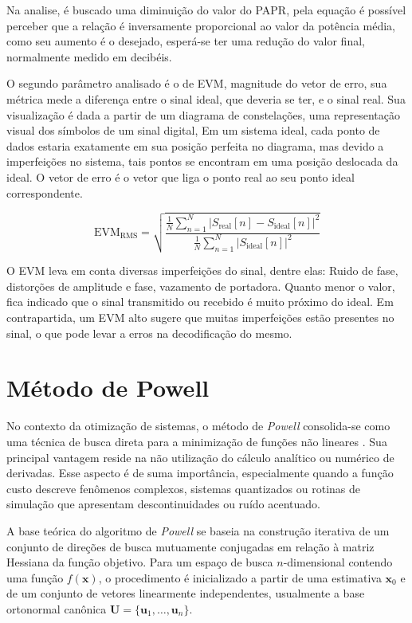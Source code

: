 Na analise, é buscado uma diminuição do valor do PAPR, pela equação é possível perceber que a relação é inversamente proporcional ao valor da potência média, como seu aumento é o desejado, esperá-se ter uma redução do valor final, normalmente medido em decibéis.

O segundo parâmetro analisado é o de EVM, magnitude do vetor de erro, sua métrica mede a diferença entre o sinal ideal, que deveria se ter, e o sinal real. Sua visualização é dada a partir de um diagrama de constelações, uma representação visual dos símbolos de um sinal digital, Em um sistema ideal, cada ponto de dados estaria exatamente em sua posição perfeita no diagrama, mas devido a imperfeições no sistema, tais pontos se encontram em uma posição deslocada da ideal. O vetor de erro é o vetor que liga o ponto real ao seu ponto ideal correspondente.


\begin{equation}
	\text{EVM}_{\text{RMS}} = \sqrt{\frac{\frac{1}{N}\sum_{n=1}^{N}|S_{\text{real}}[n] - S_{\text{ideal}}[n]|^2}{\frac{1}{N}\sum_{n=1}^{N}|S_{\text{ideal}}[n]|^2}}
\end{equation}

O EVM leva em conta diversas imperfeições do sinal, dentre elas: Ruido de fase, distorções de amplitude e fase, vazamento de portadora. Quanto menor o valor, fica indicado que o sinal transmitido ou recebido é muito próximo do ideal. Em contrapartida, um EVM alto sugere que muitas imperfeições estão presentes no sinal, o que pode levar a erros na decodificação do mesmo.


\section{Método de Powell}
No contexto da otimização de sistemas, o método de \textit{Powell} consolida-se como uma técnica de busca direta para a minimização de funções não lineares \cite{powell1964efficient}. Sua principal vantagem reside na não utilização do cálculo analítico ou numérico de derivadas. Esse aspecto é de suma importância, especialmente quando a função custo descreve fenômenos complexos, sistemas quantizados ou rotinas de simulação que apresentam descontinuidades ou ruído acentuado.

A base teórica do algoritmo de \textit{Powell} se baseia na construção iterativa de um conjunto de direções de busca mutuamente conjugadas em relação à matriz Hessiana da função objetivo. Para um espaço de busca $n$-dimensional contendo uma função $f(\mathbf{x})$, o procedimento é inicializado a partir de uma estimativa $\mathbf{x}_0$ e de um conjunto de vetores linearmente independentes, usualmente a base ortonormal canônica $\mathbf{U} = \{\mathbf{u}_1, \dots, \mathbf{u}_n\}$. 

